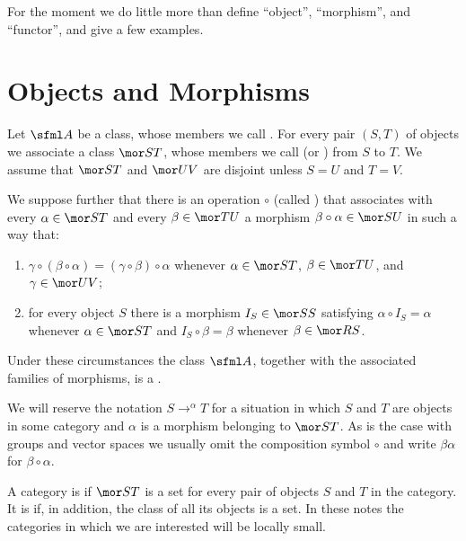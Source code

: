For the moment we do little more than define ``object'', ``morphism'', and ``functor'', and give a few examples.









\section{Objects and Morphisms}\label{C0151}
\begin{defn} Let $\sfml A$ be a class, whose members we call
. For every pair $(S,T)$ of objects we associate a class $\mor ST$, whose
members we call
 (or
) from $S$ to $T$. We assume that $\mor ST$ and $\mor UV$ are disjoint
unless $S = U$ and $T = V$.

We suppose further that there is an operation $\circ$ (called ) that
associates with every $\alpha \in \mor ST$ and every $\beta \in \mor TU$ a morphism
$\beta \circ \alpha \in \mor SU$ in such a way that:
 \begin{enumerate}
  \item $\gamma \circ (\beta \circ \alpha) = (\gamma \circ
\beta) \circ \alpha$ whenever $\alpha \in \mor ST$, $\beta \in \mor TU$, and $\gamma \in
\mor UV$;
  \item for every object $S$ there is a morphism $I_S \in
\mor SS$ satisfying $\alpha \circ I_S = \alpha$ whenever $\alpha \in \mor ST$ and $I_S
\circ \beta = \beta$ whenever $\beta \in \mor RS$.
 \end{enumerate}
Under these circumstances the class $\sfml A$, together with the associated families of
morphisms, is a
.

We will reserve the notation
$S \to^\alpha T$ for a situation in which $S$ and $T$ are objects in some category and
$\alpha$ is a morphism belonging to $\mor ST$. As is the case with groups and vector
spaces we usually omit the composition symbol $\circ$ and write
$\beta\alpha$ for $\beta \circ \alpha$.

A category is
 if $\mor ST$ is a set for every pair of objects $S$ and $T$ in the category.  It is
 if, in addition, the class of all its objects is a set.  In these notes the categories in which we are interested
will be locally small.
\end{defn}

